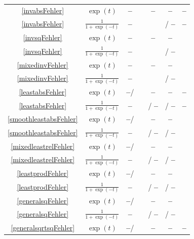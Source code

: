 \documentclass[10pt]{article}
\newcommand{\xmark}{\textbf{--}}
\begin{document}
{\begin{longtable}[c]{|c|c||c|c|c|c|c|}
		\hline
		\eqref{invabsFehler} & $\exp(t)$ & \xmark & \checkmark & \xmark & \xmark & \xmark \\
		\eqref{invabsFehler} & $\frac{1}{1+\exp(-t)}$ & \xmark & \checkmark & \checkmark & \checkmark / \xmark & \xmark \\
		\hline
		\eqref{invsqFehler} & $\exp(t)$ &\xmark & \checkmark& \xmark & \xmark &  \checkmark\\
		\eqref{invsqFehler} & $\frac{1}{1+\exp(-t)}$ &\xmark & \checkmark & \checkmark & \checkmark / \xmark & \checkmark\\
		\hline
		\eqref{mixedinvFehler} & $\exp(t)$ &\xmark & \checkmark & \xmark & \xmark &  \checkmark\\
		\eqref{mixedinvFehler} & $\frac{1}{1+\exp(-t)}$ &\xmark & \checkmark & \checkmark & \checkmark / \xmark & \checkmark\\
		\hline
		\eqref{leastabsFehler} & $\exp(t)$ & \xmark / \checkmark & \checkmark & \xmark & \xmark & \xmark \\
		\eqref{leastabsFehler} & $\frac{1}{1+\exp(-t)}$ & \xmark & \checkmark & \checkmark / \xmark & \checkmark / \xmark & \xmark \\
		\hline
		\eqref{smoothleastabsFehler} & $\exp(t)$ & \xmark / \checkmark & \checkmark & \xmark & \xmark & \checkmark \\
		\eqref{smoothleastabsFehler} & $\frac{1}{1+\exp(-t)}$ & \xmark & \checkmark & \checkmark / \xmark & \checkmark / \xmark & \checkmark\\
		\hline
		\eqref{mixedleastrelFehler} & $\exp(t)$ & \xmark / \checkmark & \checkmark & \xmark & \xmark & \checkmark\\
		\eqref{mixedleastrelFehler} &$\frac{1}{1+\exp(-t)}$ & \xmark & \checkmark & \checkmark / \xmark & \checkmark / \xmark & \checkmark\\
		\hline
		\eqref{leastprodFehler} & $\exp(t)$ & \xmark / \checkmark & \checkmark & \xmark & \xmark &  \checkmark \\
		\eqref{leastprodFehler}  &$\frac{1}{1+\exp(-t)}$ & \xmark &\checkmark & \checkmark / \xmark & \checkmark / \xmark & \checkmark\\
		\hline 
		\eqref{generalsqFehler} & $\exp(t)$ & \xmark / \checkmark & \checkmark & \xmark & \xmark & \checkmark \\
		\eqref{generalsqFehler} &$\frac{1}{1+\exp(-t)}$ & \xmark & \checkmark & \checkmark / \xmark & \checkmark / \xmark & \checkmark\\
		\hline
		\eqref{generalsqrtsqFehler} & $\exp(t)$ & \xmark / \checkmark & \checkmark & \xmark & \xmark & \xmark \\

\end{longtable}}
\end{document}

